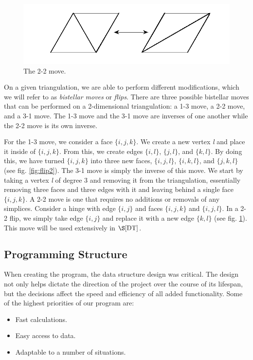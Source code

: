 \documentclass[12pt]{article}
\begin{document}
\begin{figure}
\centering
\includegraphics[scale = 0.8]{Pictures/Flip2.png}
\caption{The 2-2 move.}
\label{fig:flip}
\end{figure}

 On a given triangulation, we are able to perform different modifications, which we will refer to as \textit{bistellar moves} or \textit{flips}. There are three possible bistellar moves that can be performed on a 2-dimensional triangulation: a 1-3 move, a 2-2 move, and a 3-1 move. The 1-3 move and the 3-1 move are inverses of one another while the 2-2 move is its own inverse.

 For the 1-3 move, we consider a face $\{i, j, k\}$. We create a new vertex \textit{l} and place it inside of $\{i, j, k\}$. From this, we create edges $\{i, l\}$, $\{j, l\}$, and $\{k, l\}$. By doing this, we have turned $\{i, j, k\}$ into three new faces, $\{i, j, l\}$, $\{i, k, l\}$, and $\{j, k, l\}$ (see fig. \ref{fig:flip2}). The 3-1 move is simply the inverse of this move. We start by taking a vertex \textit{l} of degree 3 and removing it from the triangulation, essentially removing three faces and three edges with it and leaving behind a single face $\{i, j, k\}$. A 2-2 move is one that requires no additions or removals of any simplices. Consider a hinge with edge $\{i, j\}$ and faces $\{i, j, k\}$ and $\{i, j, l\}$. In a 2-2 flip, we simply take edge $\{i, j\}$ and replace it with a new edge $\{k, l\}$ (see fig. \ref{fig:flip}). This move will be used extensively in $\S\ref{DT}$.

\subsection{Programming Structure}

 When creating the program, the data structure design was critical. The design not only helps dictate the direction of the project over the course of its lifespan, but the decisions affect the speed and efficiency of all added functionality. Some of the highest priorities of our program are:
 
\begin{itemize}
\item Fast calculations.
\item Easy access to data.
\item Adaptable to a number of situations.
\end{itemize}
\end{document}
